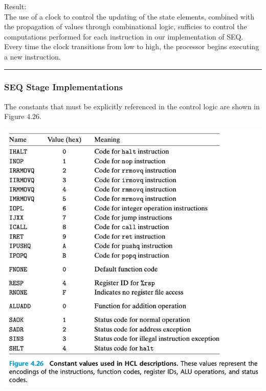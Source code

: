 \documentclass[11pt]{article}
\begin{document}
Result:\\
The use of a clock to control the updating of the state elements, combined with the propagation of values through combinational logic, sufficies to control the computations performed for each instruction in our implementation of SEQ. Every time the clock transitions from low to high, the processor begins executing a new instruction.\\

\noindent\rule{\textwidth}{0.5pt}

\subsubsection{SEQ Stage Implementations}
\label{sec:orgcb6044d}

The constants that must be explicitly referenced in the control logic are shown in Figure 4.26.\\

\begin{center}
\includegraphics[width=.9\linewidth]{pics/figure4.26-constant-values-used-in-hcl-descriptions.png}
\end{center}
\end{document}
